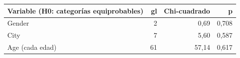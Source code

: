 \begin{tabular}{lrrr}
\toprule
Variable (H0: categorías equiprobables) & gl & Chi-cuadrado & p \\
\midrule
Gender & 2 & 0,69 & 0,708 \\
City & 7 & 5,60 & 0,587 \\
Age (cada edad) & 61 & 57,14 & 0,617 \\
\bottomrule
\end{tabular}
